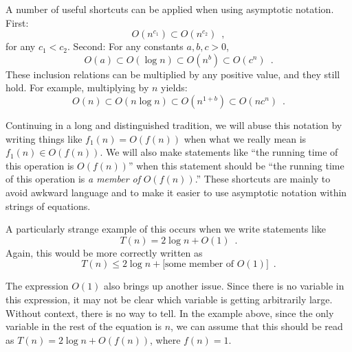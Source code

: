 A number of useful shortcuts can be applied when using asymptotic notation.  First:
\[ O(n^{c_1}) \subset O(n^{c_2}) \enspace ,\]
for any $c_1 < c_2$.  Second: For any constants $a,b,c > 0$,
\[ O(a) \subset O(\log n) \subset O(n^{b}) \subset O({c}^n) \enspace . \]
These inclusion relations can be multiplied by any positive value, and they still hold. For example, multiplying by $n$ yields:
\[ O(n) \subset O(n\log n) \subset O(n^{1+b}) \subset O(n{c}^n) \enspace . \]

Continuing in a long and distinguished tradition, we will abuse this notation by writing things like $f_1(n) = O(f(n))$ when what we really mean is $f_1(n) \in O(f(n))$.  We will also make statements like ``the running time of this operation is $O(f(n))$'' when this statement should be ``the running time of this operation is \emph{a member of} $O(f(n))$.'' These shortcuts are mainly to avoid awkward language and to make it easier to use asymptotic notation within strings of equations.

A particularly strange example of this occurs when we write statements like
\[
  T(n) = 2\log n + O(1)  \enspace .
\]
Again, this would be more correctly written as
\[
  T(n) \le 2\log n + [\mbox{some member of $O(1)$]}  \enspace .
\]

The expression $O(1)$ also brings up another issue. Since there is no variable in this expression, it may not be clear which variable is getting arbitrarily large.  Without context, there is no way to tell.  In the example above, since the only variable in the rest of the equation is $n$, we can assume that this should be read as $T(n) = 2\log n + O(f(n))$, where $f(n) = 1$.

